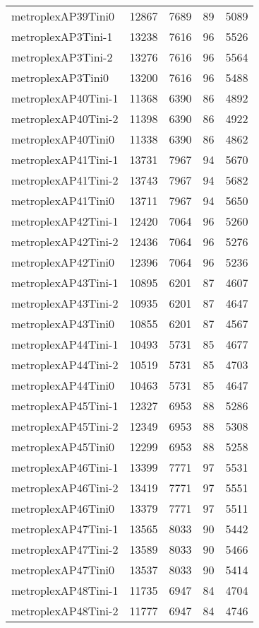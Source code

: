 \begin{longtable}{lrrrr}
metroplexAP39Tini0 & 12867 & 7689 & 89 & 5089 \\
metroplexAP3Tini-1 & 13238 & 7616 & 96 & 5526 \\
metroplexAP3Tini-2 & 13276 & 7616 & 96 & 5564 \\
metroplexAP3Tini0 & 13200 & 7616 & 96 & 5488 \\
metroplexAP40Tini-1 & 11368 & 6390 & 86 & 4892 \\
metroplexAP40Tini-2 & 11398 & 6390 & 86 & 4922 \\
metroplexAP40Tini0 & 11338 & 6390 & 86 & 4862 \\
metroplexAP41Tini-1 & 13731 & 7967 & 94 & 5670 \\
metroplexAP41Tini-2 & 13743 & 7967 & 94 & 5682 \\
metroplexAP41Tini0 & 13711 & 7967 & 94 & 5650 \\
metroplexAP42Tini-1 & 12420 & 7064 & 96 & 5260 \\
metroplexAP42Tini-2 & 12436 & 7064 & 96 & 5276 \\
metroplexAP42Tini0 & 12396 & 7064 & 96 & 5236 \\
metroplexAP43Tini-1 & 10895 & 6201 & 87 & 4607 \\
metroplexAP43Tini-2 & 10935 & 6201 & 87 & 4647 \\
metroplexAP43Tini0 & 10855 & 6201 & 87 & 4567 \\
metroplexAP44Tini-1 & 10493 & 5731 & 85 & 4677 \\
metroplexAP44Tini-2 & 10519 & 5731 & 85 & 4703 \\
metroplexAP44Tini0 & 10463 & 5731 & 85 & 4647 \\
metroplexAP45Tini-1 & 12327 & 6953 & 88 & 5286 \\
metroplexAP45Tini-2 & 12349 & 6953 & 88 & 5308 \\
metroplexAP45Tini0 & 12299 & 6953 & 88 & 5258 \\
metroplexAP46Tini-1 & 13399 & 7771 & 97 & 5531 \\
metroplexAP46Tini-2 & 13419 & 7771 & 97 & 5551 \\
metroplexAP46Tini0 & 13379 & 7771 & 97 & 5511 \\
metroplexAP47Tini-1 & 13565 & 8033 & 90 & 5442 \\
metroplexAP47Tini-2 & 13589 & 8033 & 90 & 5466 \\
metroplexAP47Tini0 & 13537 & 8033 & 90 & 5414 \\
metroplexAP48Tini-1 & 11735 & 6947 & 84 & 4704 \\
metroplexAP48Tini-2 & 11777 & 6947 & 84 & 4746 \\

\end{longtable}

